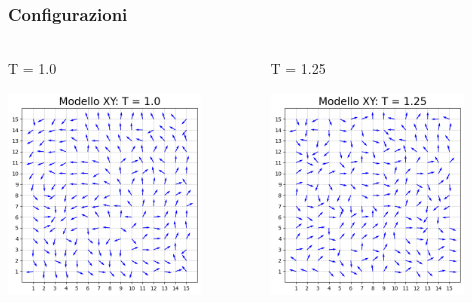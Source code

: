 \begin{frame}
    \frametitle{Configurazioni}
    \framesubtitle{}

    \begin{columns}
        \begin{column}{0.5\textwidth}
            \begin{block}{T = 1.0}

            \centering
            \includegraphics[width=0.8\textwidth]{Immagini/backupXY/conf_T1.0.png}

            \end{block}
        \end{column}
    
        \begin{column}{0.5\textwidth}
            \begin{block}{T = 1.25}

                \centering
                \includegraphics[width=0.8\textwidth]{Immagini/backupXY/conf_T1.25.png}


\end{block}
\end{column}
\end{columns}
\end{frame}
